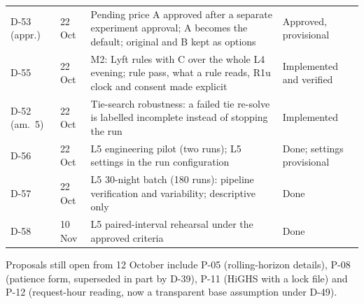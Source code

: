 \documentclass[11pt,letterpaper]{article}
\begin{document}
{\begin{longtable}{@{}P{1.25cm}P{1.45cm}P{8.0cm}P{3.0cm}@{}}
D-53 (appr.) & 22 Oct & Pending price A approved after a separate experiment approval; A becomes the default; original and B kept as options & Approved, provisional\\
D-55 & 22 Oct & M2: Lyft rules with C over the whole L4 evening; rule pass, what a rule reads, R1u clock and consent made explicit & Implemented and verified\\
D-52 (am.~5) & 22 Oct & Tie-search robustness: a failed tie re-solve is labelled incomplete instead of stopping the run & Implemented\\
D-56 & 22 Oct & L5 engineering pilot (two runs); L5 settings in the run configuration & Done; settings provisional\\
D-57 & 22 Oct & L5 30-night batch (180 runs): pipeline verification and variability; descriptive only & Done\\
D-58 & 10 Nov & L5 paired-interval rehearsal under the approved criteria & Done\\
\end{longtable}
}

Proposals still open from 12 October include P-05 (rolling-horizon details), P-08 (patience form, superseded in part by D-39), P-11 (HiGHS with a lock file) and P-12 (request-hour reading, now a transparent base assumption under D-49).
\end{document}

